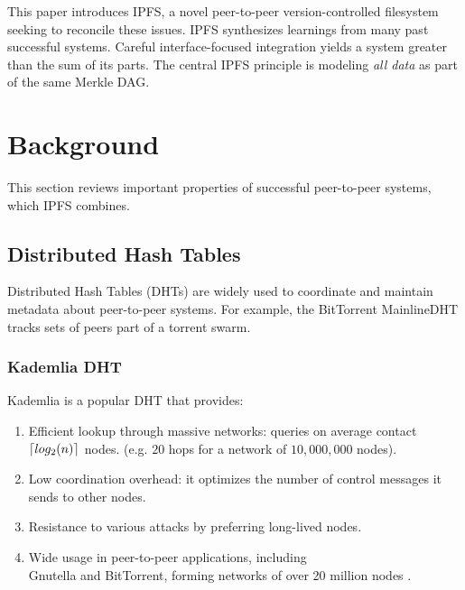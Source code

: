 \documentclass{sig-alternate}
\DeclarePairedDelimiter{\ceil}{\lceil}{\rceil}
\begin{document}
This paper introduces IPFS, a novel peer-to-peer version-controlled filesystem seeking to reconcile these issues. IPFS synthesizes learnings from many past successful systems. Careful interface-focused integration yields a system greater than the sum of its parts. The central IPFS principle is modeling \textit{all data} as part of the same Merkle DAG.

\section{Background}

This section reviews important properties of successful peer-to-peer systems, which IPFS combines.

\subsection{Distributed Hash Tables}

Distributed Hash Tables (DHTs) are widely used to coordinate and maintain metadata about peer-to-peer systems. For example, the BitTorrent MainlineDHT tracks sets of peers part of a torrent swarm.

\subsubsection{Kademlia DHT}

Kademlia \cite{Kademlia} is a popular DHT that provides:

\begin{enumerate}

  \item Efficient lookup through massive networks:
        queries on average contact $ \ceil{log_2 (n)} $ nodes.
        (e.g. $20$ hops for a network of $10,000,000$ nodes).

  \item Low coordination overhead: it optimizes the number of
        control messages it sends to other nodes.

  \item Resistance to various attacks by preferring long-lived nodes.

  \item Wide usage in peer-to-peer applications, including \\
        Gnutella and BitTorrent, forming networks of over 20 million nodes \cite{MLDHTmeasurement}.

 \end{enumerate}
\end{document}

